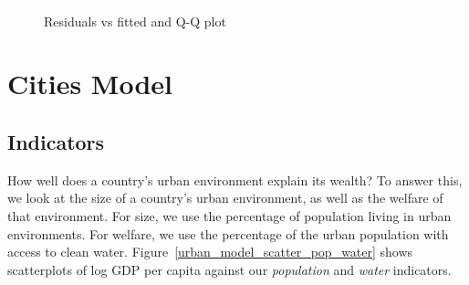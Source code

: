 \documentclass[11pt]{article}
\begin{document}
\begin{figure}[!ht]
  \centering
  \includegraphics[width=\textwidth]{images/climate_model_conditions}
  \caption{\label{climate_model_conditions}Residuals vs fitted and Q-Q plot}
\end{figure}












\section{Cities Model}
\label{sec:model_urban}

\subsection{Indicators}
How well does a country's urban environment explain its wealth? To answer this, we look at the size of a country's urban environment, as well as the welfare of that environment.
For size, we use the percentage of population living in urban environments.
For welfare, we use the percentage of the urban population with access to clean water. Figure~\ref{urban_model_scatter_pop_water} shows scatterplots of log GDP per capita against our \emph{population} and \emph{water} indicators.
\end{document}
